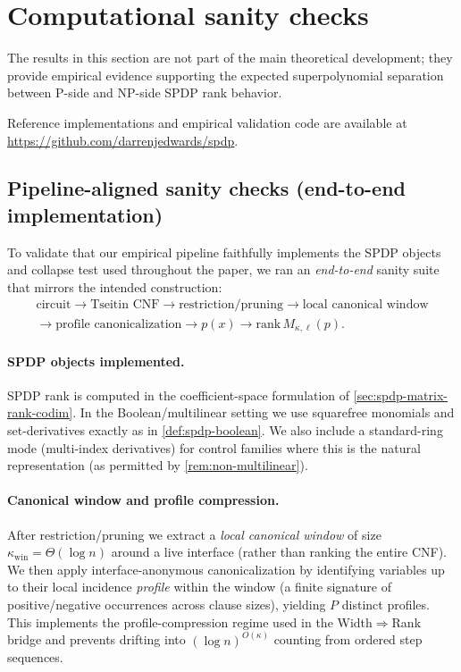 \documentclass[12pt]{article}
\theoremstyle{definition}
\theoremstyle{remark}
\begin{document}
\section{Computational sanity checks}
\label{sec:sanity-checks}

The results in this section are not part of the main theoretical development;
they provide empirical evidence supporting the expected superpolynomial
separation between P-side and NP-side SPDP rank behavior.

Reference implementations and empirical validation code are available at
\url{https://github.com/darrenjedwards/spdp}.

\subsection{Pipeline-aligned sanity checks (end-to-end implementation)}
\label{subsec:pipeline-sanity}

To validate that our empirical pipeline faithfully implements the SPDP
objects and collapse test used throughout the paper, we ran an
\emph{end-to-end} sanity suite that mirrors the intended construction:
\begin{gather*}
\text{circuit} \rightarrow \text{Tseitin CNF} \rightarrow
\text{restriction/pruning} \rightarrow
\text{local canonical window} \\
\rightarrow \text{profile canonicalization} \rightarrow
p(x) \rightarrow \mathrm{rank}\,M_{\kappa,\ell}(p).
\end{gather*}

\paragraph{SPDP objects implemented.}
SPDP rank is computed in the coefficient-space formulation of
\ref{sec:spdp-matrix-rank-codim}. In the Boolean/multilinear setting we use
squarefree monomials and set-derivatives exactly as in
\ref{def:spdp-boolean}. We
also include a standard-ring mode (multi-index derivatives) for control
families where this is the natural representation (as permitted by
\ref{rem:non-multilinear}).

\paragraph{Canonical window and profile compression.}
After restriction/pruning we extract a \emph{local canonical window} of
size $\kappa_{\mathrm{win}}=\Theta(\log n)$ around a live interface (rather
than ranking the entire CNF). We then apply interface-anonymous
canonicalization by identifying variables up to their local incidence
\emph{profile} within the window (a finite signature of
positive/negative occurrences across clause sizes), yielding $P$
distinct profiles. This implements the profile-compression regime used
in the Width$\Rightarrow$Rank bridge and prevents drifting into
$(\log n)^{O(\kappa)}$ counting from ordered step sequences.
\end{document}

